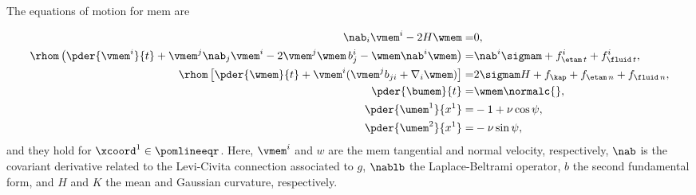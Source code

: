 The equations of motion for \ac{mem}  are \cite{worthmullerIRENEFluIdLayeR2025,al-izziShearDrivenInstabilitiesMembrane2020,arroyoRelaxationDynamicsFluid2009i}

\bw
\begin{align}
    \label{eq-dyn-continuity}
    \nab_i \vmem^i - 2 H \wmem                                                                              =            & 0,                                                                                                                                                                                       \\
    \label{eq-dyn-v}
    \rhom \left( \pder{\vmem^i}{t}+ \vmem^j \nab_j \vmem^i  - 2 \vmem^j \wmem\, b^i_j - \wmem \nab^i \wmem \right)     = & \nab^i \sigmam + f_{\etam\, t}^i + f_{\fluid\, t}^i,                                                                                                                                     \\
    \label{eq-dyn-w}
    \rhom \left[ \pder{\wmem}{t} + \vmem^i ( \vmem^j b_{ji} + \nabla_i \wmem  ) \right]                               =  & 2 \sigmam H    +  f_\kap +                                                         f_{\etam\, n}+ f_{\fluid\, n}                                                                       , \\
    \label{eq-dyn-dX}
    \pder {\bumem}{t}                                                                                            =       & \wmem \normalc{},                                                                                                                                                                        \\
    \label{eq-dyn-dX1}
    \pder {\umem^1}{x^1}                                                                                            =    & -1 + \nu \cos \psi,                                                                                                                                                                      \\
    \label{eq-dyn-dX2}
    \pder {\umem^2}{x^1}                                                                                               = & -\nu \sin \psi,
\end{align}
\ew
and they hold for $\xcoord^1 \in \pomlineeqr$.
%
Here, $\vmem^i$ and $w$ are the \ac{mem} tangential and normal velocity, respectively, $\nab$ is the covariant derivative related to the Levi-Civita connection associated to $g$, $\nablb$ the Laplace-Beltrami operator, $b$ the second fundamental form, and $H$ and $K$  the mean and Gaussian curvature, respectively.

